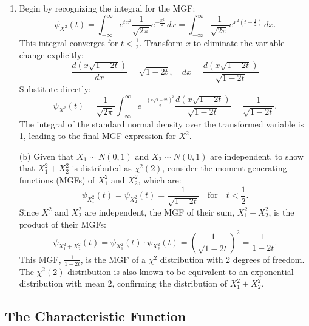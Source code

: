 \solution
\begin{enumerate}[label=(\alph*)]
    \item
    
    Begin by recognizing the integral for the MGF:
    \[
    \psi_{X^2}(t) = \int_{-\infty}^{\infty} e^{tx^2} \frac{1}{\sqrt{2\pi}} e^{-\frac{x^2}{2}} \, dx = \int_{-\infty}^{\infty} \frac{1}{\sqrt{2\pi}} e^{x^2(t - \frac{1}{2})} \, dx.
    \]
    This integral converges for \(t < \frac{1}{2}\). Transform \( x \) to eliminate the variable change explicitly:
    \[
    \frac{d(x\sqrt{1 - 2t})}{dx} = \sqrt{1 - 2t}, \quad dx = \frac{d(x\sqrt{1 - 2t})}{\sqrt{1 - 2t}}
    \]
    Substitute directly:
    \[
    \psi_{X^2}(t) = \frac{1}{\sqrt{2\pi}} \int_{-\infty}^{\infty} e^{-\frac{(x\sqrt{1 - 2t})^2}{2}} \frac{d(x\sqrt{1 - 2t})}{\sqrt{1 - 2t}} = \frac{1}{\sqrt{1 - 2t}}.
    \]
    The integral of the standard normal density over the transformed variable is 1, leading to the final MGF expression for \( X^2 \).
    \item[(b)] Given that \(X_1 \sim N(0, 1)\) and \(X_2 \sim N(0, 1)\) are independent, to show that \(X_1^2 + X_2^2\) is distributed as \(\chi^2(2)\), consider the moment generating functions (MGFs) of \(X_1^2\) and \(X_2^2\), which are:
    \[
    \psi_{X_1^2}(t) = \psi_{X_2^2}(t) = \frac{1}{\sqrt{1 - 2t}} \quad \text{for} \quad t < \frac{1}{2}.
    \]
    Since \(X_1^2\) and \(X_2^2\) are independent, the MGF of their sum, \(X_1^2 + X_2^2\), is the product of their MGFs:
    \[
    \psi_{X_1^2 + X_2^2}(t) = \psi_{X_1^2}(t) \cdot \psi_{X_2^2}(t) = \left(\frac{1}{\sqrt{1 - 2t}}\right)^2 = \frac{1}{1 - 2t}.
    \]
    This MGF, \(\frac{1}{1 - 2t}\), is the MGF of a \(\chi^2\) distribution with 2 degrees of freedom. The \(\chi^2(2)\) distribution is also known to be equivalent to an exponential distribution with mean 2, confirming the distribution of \(X_1^2 + X_2^2\).
\
\end{enumerate}


\subsection{The Characteristic Function}

\exercise

